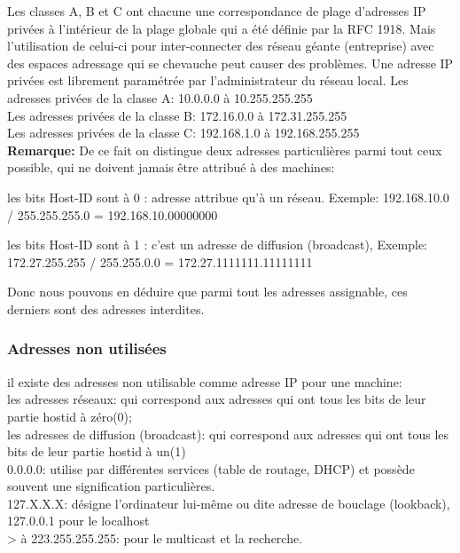 Les classes A, B et C ont chacune une correspondance de plage
d’adresses IP privées à l’intérieur de la plage globale qui a été définie par
la RFC 1918. Mais l’utilisation  de celui-ci pour inter-connecter des réseau
géante (entreprise) avec des espaces adressage qui se chevauche peut causer des
problèmes. Une adresse IP privées est librement paramétrée par l’administrateur
du réseau local.
Les adresses privées de la classe A: 10.0.0.0 à 10.255.255.255\\
Les adresses privées de la classe B: 172.16.0.0 à 172.31.255.255\\
Les adresses privées de la classe C: 192.168.1.0 à 192.168.255.255\\


\textbf{Remarque:}
De ce fait on distingue deux adresses particulières parmi tout ceux possible,
qui ne doivent jamais être attribué à des machines:

     les bits Host-ID sont à 0 : adresse attribue qu’à un réseau.
Exemple: 192.168.10.0 / 255.255.255.0 = 192.168.10.00000000

    les bits Host-ID sont à 1 : c’est un adresse de  diffusion (broadcast),
Exemple: 172.27.255.255 / 255.255.0.0 = 172.27.1111111.11111111

Donc nous pouvons en déduire que parmi tout les adresses assignable, ces
derniers sont des adresses interdites.



\subsubsection{Adresses non utilisées}
il existe des adresses non utilisable comme adresse IP pour une machine:\\
les adresses réseaux: qui correspond aux adresses qui ont tous les bits de
leur partie hostid à zéro(0);\\
les adresses de diffusion (broadcast): qui correspond aux adresses qui ont
tous les bits de leur partie hostid à un(1)\\
0.0.0.0: utilise par différentes services (table de routage, DHCP) et possède
souvent une signification particulières. \\
127.X.X.X: désigne l’ordinateur lui-même ou dite adresse de bouclage
(lookback), 127.0.0.1 pour le localhost\\
> à 223.255.255.255: pour le multicast et la recherche.\\


